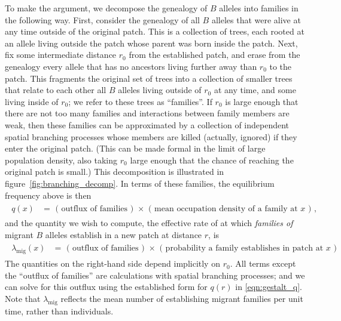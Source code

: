 \documentclass{article}
\newcommand{\migrate}{\lambda_\text{mig}}
\begin{document}
To make the argument, we decompose the genealogy of $B$ alleles into families in the following way.
First, consider the genealogy of all $B$ alleles that were alive at any time outside of the original patch.  
This is a collection of trees, each rooted at an allele living outside the patch whose parent was born inside the patch.
Next, fix some intermediate distance $r_0$ from the established patch,
and erase from the genealogy every allele that has no ancestors living further away than $r_0$ to the patch.
This fragments the original set of trees into a collection of smaller trees that relate to each other all $B$ alleles living outside of $r_0$ at any time,
and some living inside of $r_0$;
we refer to these trees as ``families''.
If $r_0$ is large enough that there are not too many families
and interactions between family members are weak,
then these families can be approximated by a collection of independent spatial branching processes
whose members are killed (actually, ignored) if they enter the original patch.
(This can be made formal in the limit of large population density, also taking $r_0$ large enough that the chance of reaching the original patch is small.)
This decomposition is illustrated in figure~\ref{fig:branching_decomp}.
In terms of these families, the equilibrium frequency above is then
\begin{align}
    \label{eqn:gestalt_q}
    \begin{split}
        q(x) &= \text{ ( outflux of families ) } \times \text{ ( mean occupation density of a family at $x$ ) } ,
\end{split}
\end{align}
and the quantity we wish to compute,
the effective rate of at which \emph{families of} migrant $B$ alleles establish in a new patch at distance $r$, 
is
\begin{align}
    \label{eqn:gestalt_migrate}
    \begin{split}
        \migrate(x) &= \text{ ( outflux of families ) } \times \text{ ( probability a family establishes in patch at $x$ ) }
    \end{split}
\end{align}
The quantities on the right-hand side depend implicitly on $r_0$.
All terms except the ``outflux of families'' are calculations with spatial branching processes;
and we can solve for this outflux using the established form for $q(r)$ in \eqref{eqn:gestalt_q}.
Note that $\migrate$ reflects the mean number of establishing migrant families per unit time, rather than individuals.
\end{document}
